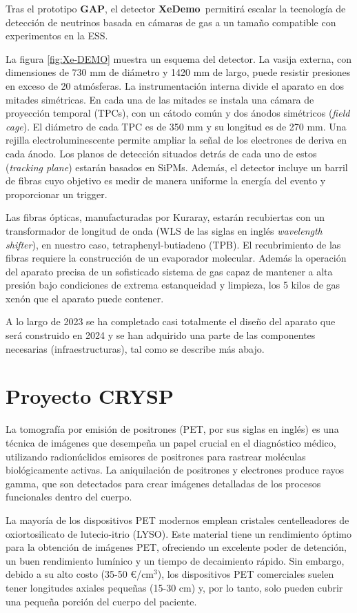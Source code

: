 \documentclass[12pt,a4paper,article]{report} %
\def\xed{{\bf XeDemo}}
\def\crysp{{\bf CRYSP }}
\begin{document}
Tras el prototipo {\bf GAP}, el detector
\xed\ permitirá escalar la tecnología de detección de neutrinos basada en cámaras de gas a un tamaño compatible con experimentos en la ESS.

La figura \ref{fig:Xe-DEMO}  muestra un esquema del detector. La vasija externa, con dimensiones de 730 mm de diámetro y 1420 mm de largo, puede resistir presiones en exceso de 20 atmósferas. La instrumentación interna divide el aparato en dos mitades simétricas. En cada una de las mitades se instala una cámara de proyección temporal (TPCs), con un cátodo común y dos ánodos simétricos ({\em field cage}). El diámetro de cada TPC es de 350 mm y su longitud es de 270 mm.  Una rejilla electroluminescente permite ampliar la señal de los electrones de deriva en cada ánodo. Los planos de detección situados detrás de cada uno de estos ({\em tracking plane}) estarán basados en SiPMs. Además, el detector incluye un barril de fibras cuyo objetivo es medir de manera uniforme la energía del evento y proporcionar un trigger.

Las fibras ópticas, manufacturadas por Kuraray, estarán recubiertas con un transformador de longitud de onda (WLS de las siglas en inglés {\em wavelength shifter}), en nuestro caso, tetraphenyl-butiadeno (TPB). El recubrimiento de las fibras requiere la construcción de un evaporador molecular. Además la operación del aparato precisa de un sofisticado sistema de gas capaz de mantener a alta presión bajo condiciones de extrema estanqueidad y limpieza, los 5 kilos de gas xenón que el aparato puede contener.

A lo largo de 2023 se ha completado casi totalmente el diseño del aparato que será construido en 2024 y se han adquirido una parte de las componentes necesarias (infraestructuras), tal como se describe más abajo.


\section*{Proyecto \crysp}

La tomografía por emisión de positrones (PET, por sus siglas en inglés) es una técnica de imágenes que desempeña un papel crucial en el diagnóstico médico, utilizando radionúclidos emisores de positrones para rastrear moléculas biológicamente activas. La aniquilación de positrones y electrones produce rayos gamma, que son detectados para crear imágenes detalladas de los procesos funcionales dentro del cuerpo.

La mayoría de los dispositivos PET modernos emplean cristales centelleadores de oxiortosilicato de lutecio-itrio (LYSO). Este material tiene un rendimiento óptimo para la obtención de imágenes PET, ofreciendo un excelente poder de detención, un buen rendimiento lumínico y un tiempo de decaimiento rápido. Sin embargo, debido a su alto costo (35-50 \euro/cm$^3$), los dispositivos PET comerciales suelen tener longitudes axiales pequeñas (15-30 cm) y, por lo tanto, solo pueden cubrir una pequeña porción del cuerpo del paciente.
\end{document}

